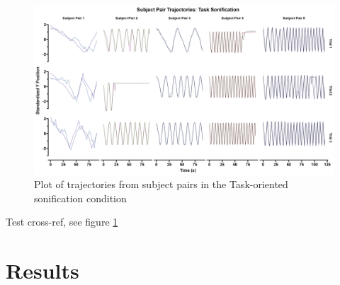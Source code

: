 \documentclass[10pt,a4paper,onecolumn]{article}
\begin{document}
\begin{figure}

{\centering \includegraphics[width=1\linewidth]{figures/mt_trajectories_task_sonification} 

}

\caption{Plot of trajectories from subject pairs in the Task-oriented sonification condition}\label{fig:mt-trajectories}
\end{figure}

Test cross-ref, see figure \ref{fig:mt-trajectories}

\hypertarget{results}{%
\section{Results}\label{results}}

\onecolumn

\printbibliography[title=References,heading=bibintoc]
\end{document}
